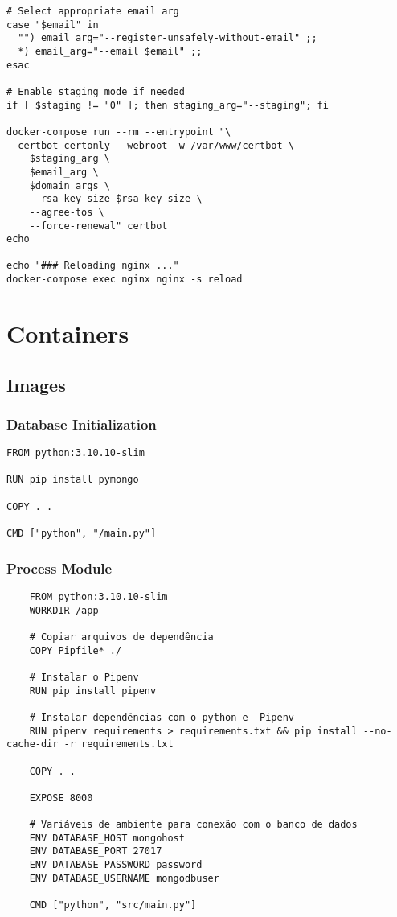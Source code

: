 \begin{Verbatim}
# Select appropriate email arg
case "$email" in
  "") email_arg="--register-unsafely-without-email" ;;
  *) email_arg="--email $email" ;;
esac

# Enable staging mode if needed
if [ $staging != "0" ]; then staging_arg="--staging"; fi

docker-compose run --rm --entrypoint "\
  certbot certonly --webroot -w /var/www/certbot \
    $staging_arg \
    $email_arg \
    $domain_args \
    --rsa-key-size $rsa_key_size \
    --agree-tos \
    --force-renewal" certbot
echo

echo "### Reloading nginx ..."
docker-compose exec nginx nginx -s reload

\end{Verbatim}

\chapter{Containers}\label{containerscompleted}

\section{Images}\label{containersimages}
\subsection{Database Initialization}\label{databaseInitializationDockerfile}
\begin{Verbatim}
FROM python:3.10.10-slim

RUN pip install pymongo

COPY . .

CMD ["python", "/main.py"]

\end{Verbatim}

\subsection{Process Module}\label{processDockerfile}
\begin{Verbatim}
    FROM python:3.10.10-slim
    WORKDIR /app
    
    # Copiar arquivos de dependência
    COPY Pipfile* ./
    
    # Instalar o Pipenv
    RUN pip install pipenv
    
    # Instalar dependências com o python e  Pipenv
    RUN pipenv requirements > requirements.txt && pip install --no-cache-dir -r requirements.txt
    
    COPY . .
    
    EXPOSE 8000
    
    # Variáveis de ambiente para conexão com o banco de dados
    ENV DATABASE_HOST mongohost
    ENV DATABASE_PORT 27017
    ENV DATABASE_PASSWORD password
    ENV DATABASE_USERNAME mongodbuser
    
    CMD ["python", "src/main.py"]
\end{Verbatim}

